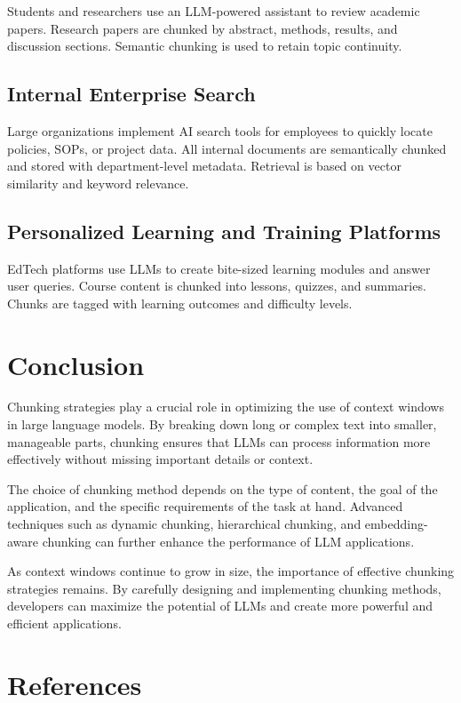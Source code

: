 \documentclass{article}
\begin{document}
Students and researchers use an LLM-powered assistant to review academic papers. Research papers are chunked by abstract, methods, results, and discussion sections. Semantic chunking is used to retain topic continuity.

\subsection{Internal Enterprise Search}

Large organizations implement AI search tools for employees to quickly locate policies, SOPs, or project data. All internal documents are semantically chunked and stored with department-level metadata. Retrieval is based on vector similarity and keyword relevance.

\subsection{Personalized Learning and Training Platforms}

EdTech platforms use LLMs to create bite-sized learning modules and answer user queries. Course content is chunked into lessons, quizzes, and summaries. Chunks are tagged with learning outcomes and difficulty levels.

\section{Conclusion}

Chunking strategies play a crucial role in optimizing the use of context windows in large language models. By breaking down long or complex text into smaller, manageable parts, chunking ensures that LLMs can process information more effectively without missing important details or context.

The choice of chunking method depends on the type of content, the goal of the application, and the specific requirements of the task at hand. Advanced techniques such as dynamic chunking, hierarchical chunking, and embedding-aware chunking can further enhance the performance of LLM applications.

As context windows continue to grow in size, the importance of effective chunking strategies remains. By carefully designing and implementing chunking methods, developers can maximize the potential of LLMs and create more powerful and efficient applications.

\section{References}
\end{document}
